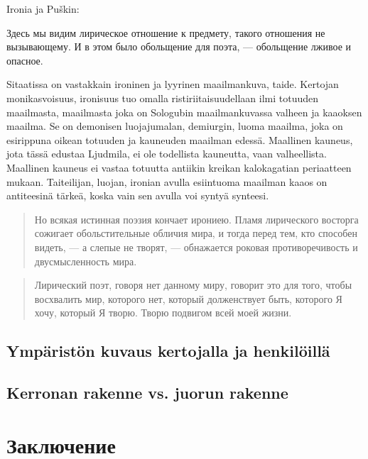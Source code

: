 \documentclass[12pt,a4paper]{article}
\begin{document}
Ironia ja Puškin:

 Здесь мы видим лирическое отношение к предмету, такого отношения не вызывающему. И в этом было обольщение для поэта, — обольщение лживое и опасное. 
 
Sitaatissa on vastakkain ironinen ja lyyrinen maailmankuva, taide. Kertojan monikasvoisuus, ironisuus tuo omalla ristiriitaisuudellaan ilmi totuuden maailmasta, maailmasta joka on Sologubin maailmankuvassa valheen ja kaaoksen maailma. Se on demonisen luojajumalan, demiurgin, luoma maailma, joka on esirippuna oikean totuuden ja kauneuden maailman edessä. Maallinen kauneus, jota tässä edustaa Ljudmila, ei ole todellista kauneutta, vaan valheellista. Maallinen kauneus ei vastaa totuutta antiikin kreikan kalokagatian periaatteen mukaan. Taiteilijan, luojan, ironian avulla esiintuoma maailman kaaos on antiteesinä tärkeä, koska vain sen avulla voi syntyä synteesi.

\begin{quote}
Но всякая истинная поэзия кончает ирониею. Пламя лирического восторга сожигает обольстительные обличия мира, и тогда перед тем, кто способен видеть, — а слепые не творят, — обнажается роковая противоречивость и двусмысленность мира.
\end{quote}

\begin{quote}
 Лирический поэт, говоря нет данному миру, говорит это для того, чтобы восхвалить мир, которого нет, который долженствует быть, которого Я хочу, который Я творю. Творю подвигом всей моей жизни. 
 \end{quote}

\subsection{Ympäristön kuvaus kertojalla ja henkilöillä}

\subsection{Kerronan rakenne vs. juorun rakenne}

\section{Заключение}



\printbibheading[heading=bibliography,title={Список использованной литературы}]
\printbibliography[heading=subbibliography,keyword={primary},title={Источники}]
\printbibliography[heading=subbibliography,notkeyword={primary},title={Исследовательская литература}]
\end{document}
